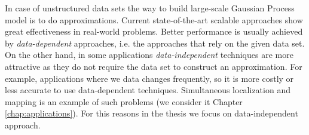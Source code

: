 In case of unstructured data sets the way to build large-scale Gaussian Process model
is to do approximations.
Current state-of-the-art scalable approaches show great effectiveness in real-world
problems.
Better performance is usually achieved by {\em data-dependent} approaches, i.e.
the approaches that rely on the given data set.
On the other hand, in some applications {\em data-independent} techniques are more attractive as
they do not require the data set to construct an approximation.
For example, applications where we data changes frequently, so it is more costly
or less accurate to use data-dependent techniques.
Simultaneous localization and mapping is an example of such problems (we consider it Chapter \ref{chap:applications}).
For this reasons in the thesis we focus on data-independent approach.




